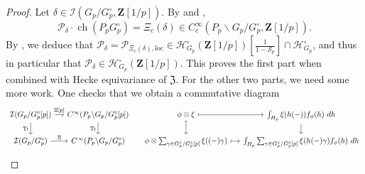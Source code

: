 \documentclass{amsart}%
\theoremstyle{plain}
\theoremstyle{plain}
\theoremstyle{remark}
\DeclareMathOperator{\ch}{ch}
\begin{document}
    \begin{proof}
        Let $\delta\in\mathcal{I}(G_p/G_p^\circ,\mathbf{Z}[1/p])$. By  and , $$\mathcal{P}_\delta\cdot \ch(P_pG_p^\circ)=\Xi_c(\delta)\in C_c^\infty(P_p\backslash G_p/G_p^\circ,\mathbf{Z}[1/p]).$$By , we deduce that $\mathcal{P}_\delta=\mathcal{P}_{\Xi_c(\delta),\mathrm{loc}}\in\mathcal{H}_{G_p}^\circ(\mathbf{Z}[1/p])[\tfrac{1}{1-\mathcal{S}_p}]\cap \mathcal{H}_{G_p}^\circ$, and thus in particular that $\mathcal{P}_\delta\in\mathcal{H}_{G_p}^\circ(\mathbf{Z}[1/p])$. This proves the first part when combined with Hecke equivariance of $\mathfrak{Z}$. For the other two parts, we need some more work.
        One checks that we obtain a commutative diagram
     \[\begin{tikzcd}[column sep=small,row sep=scriptsize]
	{\mathcal{I}(G_p/G_p^\circ[p])} & {C^\infty(P_p\backslash G_p/G_p^\circ[p])} & \phi\otimes\xi & {\int_{H_p}\xi(h(-))f_\phi(h)\ dh} \\
	{\mathcal{I}(G_p/G_p^\circ)} & {C^\infty(P_p\backslash G_p/G_p^\circ)} & {\phi\otimes\sum_{\gamma\in G_p^\circ/G_p^\circ[p]}\xi((-)\gamma)} & {\int_{H_p}\sum_{\gamma\in G_p^\circ/G_p^\circ[p]}\xi(h(-)\gamma)f_\phi(h)\ dh}
	\arrow["{{\Xi[p]}}", from=1-1, to=1-2]
	\arrow["{{\mathrm{Tr}}}"', from=1-1, to=2-1]
	\arrow["{{\mathrm{Tr}}}"', from=1-2, to=2-2]
	\arrow[maps to, from=1-3, to=1-4]
	\arrow[maps to, from=1-3, to=2-3]
	\arrow[from=1-4, to=2-4]
	\arrow["\Xi", from=2-1, to=2-2]
	\arrow[maps to, from=2-3, to=2-4]
\end{tikzcd}\]

\end{proof}
\end{document}
